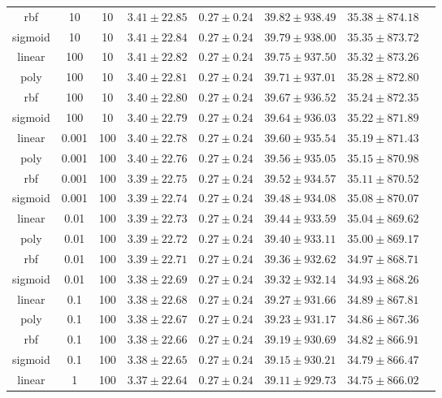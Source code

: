 \begin{tabular}{cccrrrrr}
rbf & 10 & 10 & $3.41 \pm 22.85$ & $0.27 \pm 0.24$ & $39.82 \pm 938.49$ & $35.38 \pm 874.18$\\
sigmoid & 10 & 10 & $3.41 \pm 22.84$ & $0.27 \pm 0.24$ & $39.79 \pm 938.00$ & $35.35 \pm 873.72$\\
linear & 100 & 10 & $3.41 \pm 22.82$ & $0.27 \pm 0.24$ & $39.75 \pm 937.50$ & $35.32 \pm 873.26$\\
poly & 100 & 10 & $3.40 \pm 22.81$ & $0.27 \pm 0.24$ & $39.71 \pm 937.01$ & $35.28 \pm 872.80$\\
rbf & 100 & 10 & $3.40 \pm 22.80$ & $0.27 \pm 0.24$ & $39.67 \pm 936.52$ & $35.24 \pm 872.35$\\
sigmoid & 100 & 10 & $3.40 \pm 22.79$ & $0.27 \pm 0.24$ & $39.64 \pm 936.03$ & $35.22 \pm 871.89$\\
linear & 0.001 & 100 & $3.40 \pm 22.78$ & $0.27 \pm 0.24$ & $39.60 \pm 935.54$ & $35.19 \pm 871.43$\\
poly & 0.001 & 100 & $3.40 \pm 22.76$ & $0.27 \pm 0.24$ & $39.56 \pm 935.05$ & $35.15 \pm 870.98$\\
rbf & 0.001 & 100 & $3.39 \pm 22.75$ & $0.27 \pm 0.24$ & $39.52 \pm 934.57$ & $35.11 \pm 870.52$\\
sigmoid & 0.001 & 100 & $3.39 \pm 22.74$ & $0.27 \pm 0.24$ & $39.48 \pm 934.08$ & $35.08 \pm 870.07$\\
linear & 0.01 & 100 & $3.39 \pm 22.73$ & $0.27 \pm 0.24$ & $39.44 \pm 933.59$ & $35.04 \pm 869.62$\\
poly & 0.01 & 100 & $3.39 \pm 22.72$ & $0.27 \pm 0.24$ & $39.40 \pm 933.11$ & $35.00 \pm 869.17$\\
rbf & 0.01 & 100 & $3.39 \pm 22.71$ & $0.27 \pm 0.24$ & $39.36 \pm 932.62$ & $34.97 \pm 868.71$\\
sigmoid & 0.01 & 100 & $3.38 \pm 22.69$ & $0.27 \pm 0.24$ & $39.32 \pm 932.14$ & $34.93 \pm 868.26$\\
linear & 0.1 & 100 & $3.38 \pm 22.68$ & $0.27 \pm 0.24$ & $39.27 \pm 931.66$ & $34.89 \pm 867.81$\\
poly & 0.1 & 100 & $3.38 \pm 22.67$ & $0.27 \pm 0.24$ & $39.23 \pm 931.17$ & $34.86 \pm 867.36$\\
rbf & 0.1 & 100 & $3.38 \pm 22.66$ & $0.27 \pm 0.24$ & $39.19 \pm 930.69$ & $34.82 \pm 866.91$\\
sigmoid & 0.1 & 100 & $3.38 \pm 22.65$ & $0.27 \pm 0.24$ & $39.15 \pm 930.21$ & $34.79 \pm 866.47$\\
linear & 1 & 100 & $3.37 \pm 22.64$ & $0.27 \pm 0.24$ & $39.11 \pm 929.73$ & $34.75 \pm 866.02$\\

\end{tabular}
